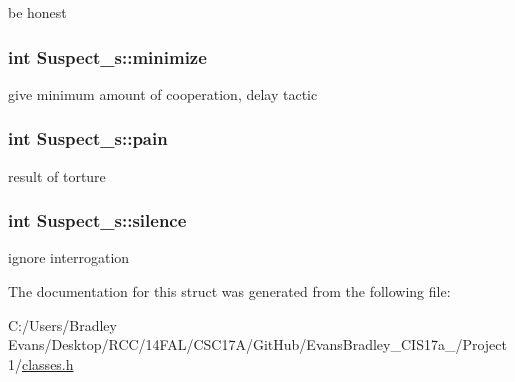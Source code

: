 be honest 

\hypertarget{struct_suspect__s_a0bdb6fa57ffea54acd294d24b749fb95}{
\subsubsection[{minimize}]{\setlength{\rightskip}{0pt plus 5cm}int Suspect\+\_\+s\+::minimize}}\label{struct_suspect__s_a0bdb6fa57ffea54acd294d24b749fb95}


give minimum amount of cooperation, delay tactic 

\hypertarget{struct_suspect__s_a7b6fc79ab716033592c1f3b0e8797e57}{
\subsubsection[{pain}]{\setlength{\rightskip}{0pt plus 5cm}int Suspect\+\_\+s\+::pain}}\label{struct_suspect__s_a7b6fc79ab716033592c1f3b0e8797e57}


result of torture 

\hypertarget{struct_suspect__s_a2bb8b0ca3470b4dfb856f631b7ac5da0}{
\subsubsection[{silence}]{\setlength{\rightskip}{0pt plus 5cm}int Suspect\+\_\+s\+::silence}}\label{struct_suspect__s_a2bb8b0ca3470b4dfb856f631b7ac5da0}


ignore interrogation 



The documentation for this struct was generated from the following file\+:\begin{DoxyCompactItemize}
\item 
C\+:/\+Users/\+Bradley Evans/\+Desktop/\+R\+C\+C/14\+F\+A\+L/\+C\+S\+C17\+A/\+Git\+Hub/\+Evans\+Bradley\+\_\+\+C\+I\+S17a\+\_/\+Project 1/\hyperlink{classes_8h}{classes.\+h}\end{DoxyCompactItemize}
